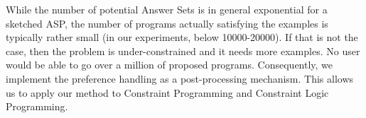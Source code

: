 While the number of potential Answer Sets is in general exponential for
a sketched ASP, the number of programs actually satisfying the
examples is typically rather small (in our experiments, below 10000-20000). If that is not the case, then the problem is 
under-constrained and it needs more examples. No user would be able to
go over a million of proposed programs. Consequently, we  implement
the preference handling as a post-processing mechanism. This allows us
to apply our method to Constraint Programming and Constraint Logic Programming.





